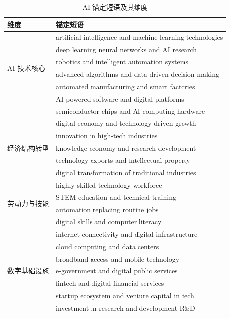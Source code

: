 \documentclass[11pt,a4paper]{article}
\begin{document}
\begin{table}[H]
\centering
\caption{AI 锚定短语及其维度}
\label{tab:anchors}
\small
\begin{tabular}{ll}
\toprule
\textbf{维度} & \textbf{锚定短语} \\
\midrule
\multirow{6}{*}{AI 技术核心}
    & artificial intelligence and machine learning technologies \\
    & deep learning neural networks and AI research \\
    & robotics and intelligent automation systems \\
    & advanced algorithms and data-driven decision making \\
    & automated manufacturing and smart factories \\
    & AI-powered software and digital platforms \\
    & semiconductor chips and AI computing hardware \\
\midrule
\multirow{5}{*}{经济结构转型}
    & digital economy and technology-driven growth \\
    & innovation in high-tech industries \\
    & knowledge economy and research development \\
    & technology exports and intellectual property \\
    & digital transformation of traditional industries \\
\midrule
\multirow{4}{*}{劳动力与技能}
    & highly skilled technology workforce \\
    & STEM education and technical training \\
    & automation replacing routine jobs \\
    & digital skills and computer literacy \\
\midrule
\multirow{7}{*}{数字基础设施}
    & internet connectivity and digital infrastructure \\
    & cloud computing and data centers \\
    & broadband access and mobile technology \\
    & e-government and digital public services \\
    & fintech and digital financial services \\
    & startup ecosystem and venture capital in tech \\
    & investment in research and development R\&D \\
\bottomrule
\end{tabular}
\end{table}
\end{document}
